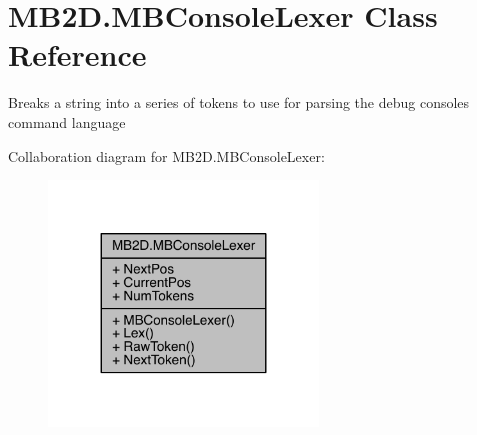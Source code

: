 \hypertarget{class_m_b2_d_1_1_m_b_console_lexer}{}\section{M\+B2\+D.\+M\+B\+Console\+Lexer Class Reference}
\label{class_m_b2_d_1_1_m_b_console_lexer}


Breaks a string into a series of tokens to use for parsing the debug consoles command language  




Collaboration diagram for M\+B2\+D.\+M\+B\+Console\+Lexer\+:
\nopagebreak
\begin{figure}[H]
\begin{center}
\leavevmode
\includegraphics[width=203pt]{class_m_b2_d_1_1_m_b_console_lexer__coll__graph}
\end{center}
\end{figure}
